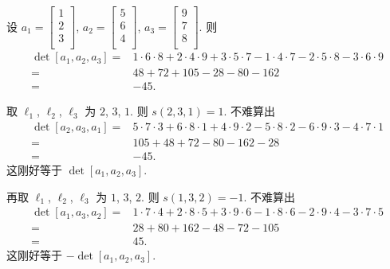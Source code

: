 \documentclass[%
    UTF8,%
    fontset=none,%
    punct=kaiming,%
    zihao=-4,%
    a4paper,%
    oneside,%
]{ctexbook}
\begin{document}
\begin{example}
    设
    \(a_1 =  \begin{bmatrix}
        1 \\2\\3\\
    \end{bmatrix}\),
    \(a_2 =  \begin{bmatrix}
        5 \\6\\4\\
    \end{bmatrix}\),
    \(a_3 =  \begin{bmatrix}
        9 \\7\\8\\
    \end{bmatrix}\).
    则
    \begin{align*}
        \det {[a_1, a_2, a_3]}
        = {} &
        1 \cdot 6 \cdot 8
        + 2 \cdot 4 \cdot 9
        + 3 \cdot 5 \cdot 7
        - 1 \cdot 4 \cdot 7
        - 2 \cdot 5 \cdot 8
        - 3 \cdot 6 \cdot 9
        \\
        = {} &
        48 + 72 + 105 - 28 - 80 - 162
        \\
        = {} & {-45}.
    \end{align*}

    取 \(\ell_1\), \(\ell_2\), \(\ell_3\) 为 \(2\), \(3\), \(1\).
    则 \(s(2, 3, 1) = 1\).
    不难算出
    \begin{align*}
        \det {[a_2, a_3, a_1]}
        = {} &
        5 \cdot 7 \cdot 3
        + 6 \cdot 8 \cdot 1
        + 4 \cdot 9 \cdot 2
        - 5 \cdot 8 \cdot 2
        - 6 \cdot 9 \cdot 3
        - 4 \cdot 7 \cdot 1
        \\
        = {} &
        105 + 48 + 72 - 80 - 162 - 28
        \\
        = {} & {-45}.
    \end{align*}
    这刚好等于 \(\det {[a_1, a_2, a_3]}\).

    再取 \(\ell_1\), \(\ell_2\), \(\ell_3\)
    为 \(1\), \(3\), \(2\).
    则 \(s(1, 3, 2) = -1\).
    不难算出
    \begin{align*}
        \det {[a_1, a_3, a_2]}
        = {} &
        1 \cdot 7 \cdot 4
        + 2 \cdot 8 \cdot 5
        + 3 \cdot 9 \cdot 6
        - 1 \cdot 8 \cdot 6
        - 2 \cdot 9 \cdot 4
        - 3 \cdot 7 \cdot 5
        \\
        = {} &
        28 + 80 + 162 - 48 - 72 - 105
        \\
        = {} & 45.
    \end{align*}
    这刚好等于 \(-\det {[a_1, a_2, a_3]}\).
\end{example}
\end{document}
